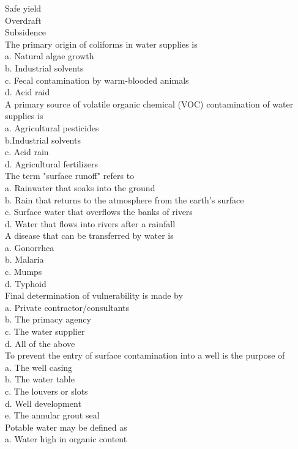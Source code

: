 Safe yield\\
Overdraft\\
Subsidence\\
  The primary origin of coliforms in water supplies is\\
a. Natural algae growth\\
b. Industrial solvents\\
c. Fecal contamination by warm-blooded animals\\
d. Acid raid\\
A primary source of volatile organic chemical (VOC) contamination of water supplies is\\
a. Agricultural pesticides\\
b.Industrial solvents\\
c. Acid rain\\
d. Agricultural fertilizers\\
The term "surface runoff" refers to\\
a. Rainwater that soaks into the ground\\
b. Rain that returns to the atmosphere from the earth's surface\\
c. Surface water that overflows the banks of rivers\\
d. Water that flows into rivers after a rainfall\\
  A disease that can be transferred by water is\\
a. Gonorrhea\\
b. Malaria\\
c. Mumps\\
d. Typhoid\\
  Final determination of vulnerability is made by\\
a. Private contractor/consultants\\
b. The primacy agency\\
c. The water supplier\\
d. All of the above\\
  To prevent the entry of surface contamination into a well is the purpose of\\
a. The well casing\\
b. The water table\\
c. The louvers or slots\\
d. Well development\\
e. The annular grout seal\\
Potable water may be defined as\\
a. Water high in organic content\\

